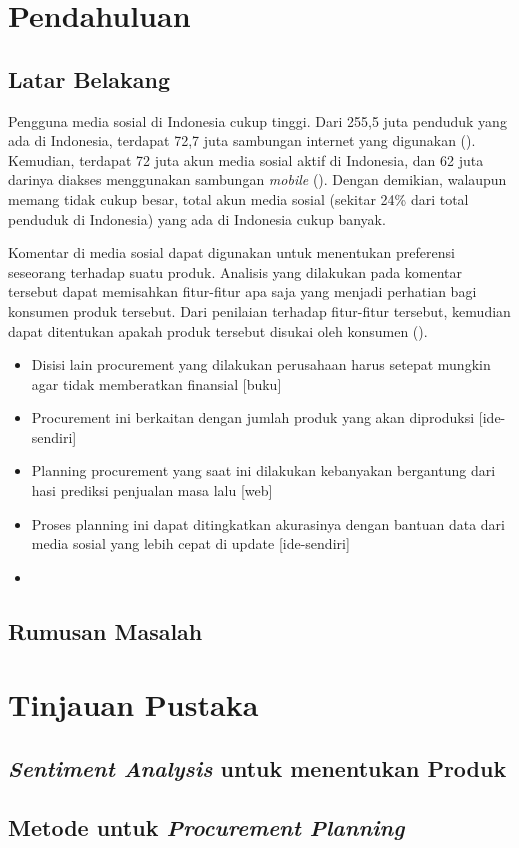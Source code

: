 \documentclass[]{article}
\begin{document}
\begin{spacing}{1.5}

\section{Pendahuluan}
\subsection{Latar Belakang}
Pengguna media sosial di Indonesia cukup tinggi. Dari 255,5 juta penduduk yang ada di Indonesia,
terdapat 72,7 juta sambungan internet yang digunakan (\cite{SK2015}). Kemudian, terdapat 72 juta
akun media sosial aktif di Indonesia, dan 62 juta darinya diakses menggunakan sambungan 
\textit{mobile} (\cite{SK2015}). Dengan demikian, walaupun memang tidak cukup besar, total akun
media sosial (sekitar 24\% dari total penduduk di Indonesia) yang ada di Indonesia cukup banyak.

Komentar di media sosial dapat digunakan untuk menentukan preferensi seseorang terhadap suatu
produk. Analisis yang dilakukan pada komentar tersebut dapat memisahkan fitur-fitur apa saja yang
menjadi perhatian bagi konsumen produk tersebut. Dari penilaian terhadap fitur-fitur tersebut,
kemudian dapat ditentukan apakah produk tersebut disukai oleh konsumen (\cite{SM2012}).


\begin{itemize}
    \item Disisi lain procurement yang dilakukan perusahaan harus setepat mungkin agar tidak memberatkan finansial [buku]
    \item Procurement ini berkaitan dengan jumlah produk yang akan diproduksi [ide-sendiri]
    \item Planning procurement yang saat ini dilakukan kebanyakan bergantung dari hasi prediksi penjualan masa lalu [web]
    \item Proses planning ini dapat ditingkatkan akurasinya dengan bantuan data dari media sosial yang lebih cepat di
        update [ide-sendiri]
\end{itemize}
\par
\begin{itemize}
    \item 
\end{itemize}
\par
\subsection{Rumusan Masalah}
\newpage

\section{Tinjauan Pustaka}
\subsection{\textit{Sentiment Analysis} untuk menentukan Produk}
\subsection{Metode untuk \textit{Procurement Planning}}
\newpage

\renewcommand{\refname}{Daftar Pustaka}
\printbibliography

\end{spacing}
\end{document}
